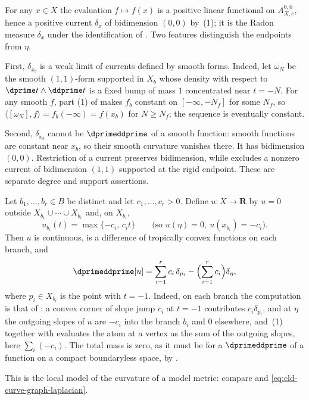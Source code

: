 \begin{example}
\label{ex:ch14-line-diracs}
For any $x\in X$ the evaluation $f\mapsto f(x)$ is a positive linear
functional on $A_{X,c}^{0,0}$, hence a positive current $\delta_x$ of
bidimension $(0,0)$ by
\,(1); it is the Radon measure
$\delta_x$ under the identification of
.  Two features distinguish the endpoints
from $\eta$.

First, $\delta_{x_b}$ is a weak limit of currents defined by smooth forms.
Indeed, let $\omega_N$ be the smooth $(1,1)$-form supported in $X_b$ whose
density with respect to $\dprime t\wedge\ddprime t$ is a fixed bump of mass
$1$ concentrated near $t=-N$.  For any smooth $f$, part (1) of
 makes $f_b$ constant on
$[-\infty,-N_f]$ for some $N_f$, so
$\langle[\omega_N],f\rangle=f_b(-\infty)=f(x_b)$ for $N\ge N_f$; the sequence
is eventually constant.

Second, $\delta_{x_b}$ cannot be $\dprimeddprime$ of a smooth function:
smooth functions are constant near $x_b$, so their smooth curvature
vanishes there. It has bidimension $(0,0)$. Restriction of a current
preserves bidimension, while
 excludes a nonzero current of
bidimension $(1,1)$ supported at the rigid endpoint. These are separate
degree and support assertions.
\end{example}

\begin{example}
\label{ex:ch14-line-model-function}
Let $b_1,\ldots,b_r\in B$ be distinct and let $c_1,\ldots,c_r>0$.  Define
$u:X\to\mathbf R$ by $u=0$ outside $X_{b_1}\cup\cdots\cup X_{b_r}$ and, on
$X_{b_i}$,
\[
 u_{b_i}(t)=\max\{-c_i,\,c_it\}
 \qquad\text{(so }u(\eta)=0,\ u(x_{b_i})=-c_i).
\]
Then $u$ is continuous, is a difference of tropically convex functions on
each branch, and
\[
 \dprimeddprime[u]
 =\sum_{i=1}^rc_i\,\delta_{p_i}
   -\Bigl(\sum_{i=1}^rc_i\Bigr)\delta_\eta,
\]
where $p_i\in X_{b_i}$ is the point with $t=-1$.  Indeed, on each branch the
computation is that of : a convex corner
of slope jump $c_i$ at $t=-1$ contributes $c_i\delta_{p_i}$, and at $\eta$
the outgoing slopes of $u$ are $-c_i$ into the branch $b_i$ and $0$ elsewhere,
and \,(1) together with
 evaluates the atom at a vertex as the sum of the
outgoing slopes, here $\sum_i(-c_i)$.  The total mass is zero, as it must be for a
$\dprimeddprime$ of a function on a compact boundaryless space, by
.

This is the local model of the curvature of a model metric: compare
 and \eqref{eq:cld-curve-graph-laplacian}.
\end{example}

